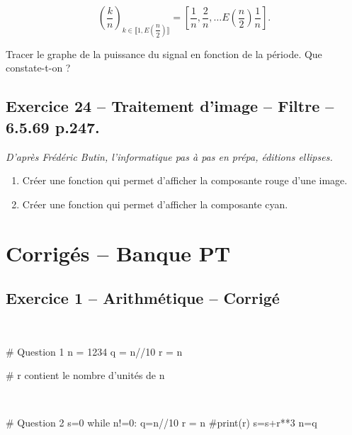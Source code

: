 \documentclass[10pt,fleqn]{article} %
\begin{document}
\begin{multicols}{2}
\begin{enumerate}
$$
\left( \dfrac{k}{n} \right)_{k\in \llbracket 1, E\left(\dfrac{n}{2}\right) \rrbracket} = \left[ \dfrac{1}{n},\dfrac{2}{n},\ldots E\left(\dfrac{n}{2}\right) \dfrac{1}{n}\right].
$$

Tracer le graphe de la puissance du signal en fonction de la période. Que constate-t-on ?
\end{enumerate}

\subsection*{Exercice 24 -- Traitement d'image -- Filtre -- 6.5.69 p.247.}
\begin{flushright}
\textit{D'après Frédéric Butin, l'informatique pas à pas en prépa, éditions ellipses.}
\end{flushright}

\begin{enumerate}
\item Créer une fonction qui permet d'afficher la composante rouge d'une image. 
\item Créer une fonction qui permet d'afficher la composante cyan.
\end{enumerate}

\end{multicols}



\newpage 

\section{Corrigés -- Banque PT}
\subsection*{Exercice 1 -- Arithmétique -- Corrigé}

\begin{corrige}
$\quad$
\begin{python}
# Question 1
n = 1234
q = n//10
r =  n%

# r contient le nombre d'unités de n
\end{python}
\end{corrige}

\begin{corrige}
$\quad$
\begin{python}
# Question 2
s=0
while n!=0:
    q=n//10
    r = n%
    #print(r)
    s=s+r**3
    n=q
\end{python}
\end{corrige}
\end{document}
